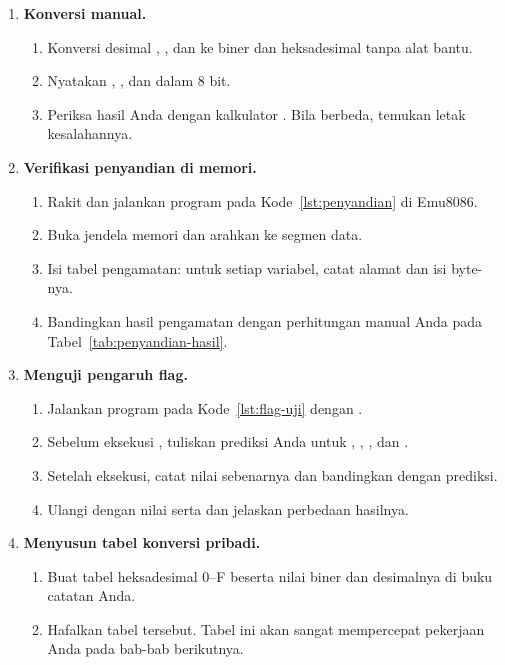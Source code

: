 \begin{enumerate}
    \item \textbf{Konversi manual.}
    \begin{enumerate}
        \item Konversi desimal , , dan  ke
              biner dan heksadesimal tanpa alat bantu.
        \item Nyatakan , , dan  dalam
               8 bit.
        \item Periksa hasil Anda dengan kalkulator .
              Bila berbeda, temukan letak kesalahannya.
    \end{enumerate}

    \item \textbf{Verifikasi penyandian di memori.}
    \begin{enumerate}
        \item Rakit dan jalankan program pada Kode~\ref{lst:penyandian}
              di Emu8086.
        \item Buka jendela memori dan arahkan ke segmen data.
        \item Isi tabel pengamatan: untuk setiap variabel, catat
              alamat dan isi byte-nya.
        \item Bandingkan hasil pengamatan dengan perhitungan manual
              Anda pada Tabel~\ref{tab:penyandian-hasil}.
    \end{enumerate}

    \item \textbf{Menguji pengaruh flag.}
    \begin{enumerate}
        \item Jalankan program pada Kode~\ref{lst:flag-uji} dengan
              .
        \item Sebelum eksekusi , tuliskan prediksi
              Anda untuk , , , dan
              .
        \item Setelah eksekusi, catat nilai sebenarnya dan bandingkan
              dengan prediksi.
        \item Ulangi dengan nilai  serta  dan
              jelaskan perbedaan hasilnya.
    \end{enumerate}

    \item \textbf{Menyusun tabel konversi pribadi.}
    \begin{enumerate}
        \item Buat tabel heksadesimal 0--F beserta nilai biner dan
              desimalnya di buku catatan Anda.
        \item Hafalkan tabel tersebut. Tabel ini akan sangat
              mempercepat pekerjaan Anda pada bab-bab berikutnya.
    \end{enumerate}
\end{enumerate}


